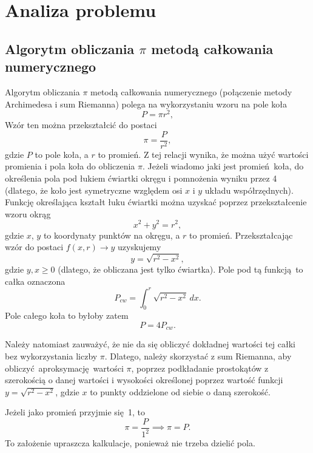 \newpage
\section{Analiza problemu}		%

\subsection{Algorytm obliczania $\pi$ metodą całkowania numerycznego}

Algorytm obliczania $\pi$ metodą całkowania numerycznego (połączenie metody Archimedesa\cite{archimedes} i sum Riemanna\cite{riemannwiki}) polega na wykorzystaniu wzoru na pole koła \[P = \pi r^2,\] Wzór ten można przekształcić do postaci \[\pi = \frac{P}{r^2},\] gdzie $P$ to pole koła, a $r$ to promień. Z tej relacji wynika, że można użyć wartości promienia i pola koła do obliczenia $\pi$. Jeżeli wiadomo jaki jest promień koła, do określenia pola pod łukiem ćwiartki okręgu i pomnożenia wyniku przez 4 (dlatego, że koło jest symetryczne względem osi $x$ i $y$ układu współrzędnych). Funkcję określająca kształt łuku ćwiartki można uzyskać poprzez przekształcenie wzoru okrąg \[x^2 + y^2 = r^2,\] gdzie $x$, $y$ to koordynaty punktów na okręgu, a $r$ to promień. Przekształcając wzór do postaci $f(x,r) \to y$ uzyskujemy \[y = \sqrt{r^2 - x^2},\] gdzie $y, x \geq 0$ (dlatego, że obliczana jest tylko ćwiartka). Pole pod tą funkcją to całka oznaczona \[P_{cw} = \int_{0}^{r} \sqrt{r^2 - x^2} \,dx.\] Pole całego koła to byłoby zatem \[P = 4P_{cw}.\]

Należy natomiast zauważyć, że nie da się obliczyć dokładnej wartości tej całki bez wykorzystania liczby $\pi$. Dlatego, należy skorzystać z sum Riemanna\cite{riemannwiki}, aby obliczyć aproksymację wartości $\pi$, poprzez podkładanie prostokątów z szerokością o danej wartości i wysokości określonej poprzez wartość funkcji $y = \sqrt{r^2 - x^2}$, gdzie $x$ to punkty oddzielone od siebie o daną szerokość.

Jeżeli jako promień przyjmie się 1, to \[\pi = \frac{P}{1^2} \implies \pi = P.\] To założenie upraszcza kalkulacje, ponieważ nie trzeba dzielić pola.

